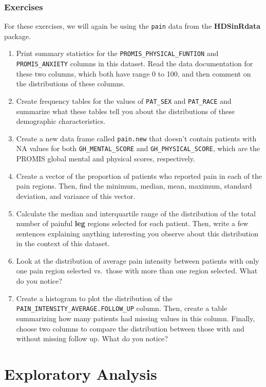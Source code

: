 \documentclass[
  letterpaper,
]{krantz}
\begin{document}
\section{Exercises}\label{exercises-1}

For these exercises, we will again be using the \texttt{pain} data from
the \textbf{HDSinRdata} package.

\begin{enumerate}
\def\labelenumi{\arabic{enumi}.}
\item
  Print summary statistics for the \texttt{PROMIS\_PHYSICAL\_FUNTION}
  and \texttt{PROMIS\_ANXIETY} columns in this dataset. Read the data
  documentation for these two columns, which both have range 0 to 100,
  and then comment on the distributions of these columns.
\item
  Create frequency tables for the values of \texttt{PAT\_SEX} and
  \texttt{PAT\_RACE} and summarize what these tables tell you about the
  distributions of these demographic characteristics.
\item
  Create a new data frame called \texttt{pain.new} that doesn't contain
  patients with NA values for both \texttt{GH\_MENTAL\_SCORE} and
  \texttt{GH\_PHYSICAL\_SCORE}, which are the PROMIS global mental and
  physical scores, respectively.
\item
  Create a vector of the proportion of patients who reported pain in
  each of the pain regions. Then, find the minimum, median, mean,
  maximum, standard deviation, and variance of this vector.
\item
  Calculate the median and interquartile range of the distribution of
  the total number of painful \textbf{leg} regions selected for each
  patient. Then, write a few sentences explaining anything interesting
  you observe about this distribution in the context of this dataset.
\item
  Look at the distribution of average pain intensity between patients
  with only one pain region selected vs.~those with more than one region
  selected. What do you notice?
\item
  Create a histogram to plot the distribution of the
  \texttt{PAIN\_INTENSITY\_AVERAGE.FOLLOW\_UP} column. Then, create a
  table summarizing how many patients had missing values in this column.
  Finally, choose two columns to compare the distribution between those
  with and without missing follow up. What do you notice?
\end{enumerate}

\part{Exploratory Analysis}
\end{document}
